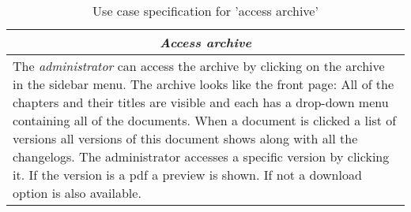\begin{table}
\centering
\begin{tabular}{p{12cm}}
\hline
\multicolumn{1}{c}{\textit{\textbf{Access archive}}} \\
\hline
The \textit{administrator} can access the archive by clicking on the archive in the sidebar menu.
The archive looks like the front page:
All of the chapters and their titles are visible and each has a drop-down menu containing all of the documents.
When a document is clicked a list of versions all versions of this document shows along with all the changelogs.
The administrator accesses a specific version by clicking it.
If the version is a pdf a preview is shown.
If not a download option is also available.
\\\hline
\end{tabular}
\caption{Use case specification for 'access archive'}\label{tab:archive}
\end{table}